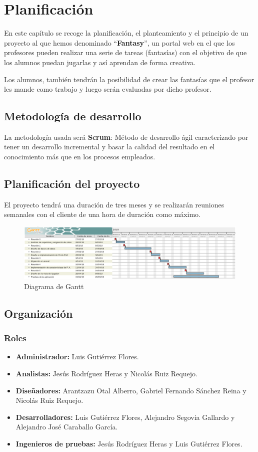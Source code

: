 \chapter{Planificación}
En este capítulo se recoge la planificación, el planteamiento y el principio de un proyecto al que hemos denominado ``\textbf{Fantasy}'', un portal web en el que los profesores pueden realizar una serie de tareas (fantasías) con el objetivo de que los alumnos puedan jugarlas y así aprendan de forma creativa.

Los alumnos, también tendrán la posibilidad de crear las fantasías que el profesor les mande como trabajo y luego serán evaluadas por dicho profesor.

\section{Metodología de desarrollo}
La metodología usada será \textbf{Scrum}: Método de desarrollo ágil caracterizado por tener un desarrollo incremental y basar la calidad del resultado en el conocimiento más que en los procesos empleados.

\section{Planificación del proyecto}
El proyecto tendrá una duración de tres meses y se realizarán reuniones semanales con el cliente de una hora de duración como máximo.
\begin{figure}[h]
	\centering
	\includegraphics[scale=0.42]{Gantt.png}
	\caption{Diagrama de Gantt}
	\label{Diagrama de Gantt}
\end{figure}

\section{Organización}
\subsection{Roles}
\begin{itemize}
	\item \textbf{Administrador:} Luis Gutiérrez Flores.
	\item \textbf{Analistas:} Jesús Rodríguez Heras y Nicolás Ruiz Requejo.
	\item \textbf{Diseñadores:} Arantzazu Otal Alberro, Gabriel Fernando Sánchez Reina y Nicolás Ruiz Requejo.
	\item \textbf{Desarrolladores:} Luis Gutiérrez Flores, Alejandro Segovia Gallardo y Alejandro José Caraballo García.
	\item \textbf{Ingenieros de pruebas:} Jesús Rodríguez Heras y Luis Gutiérrez Flores.
\end{itemize}

